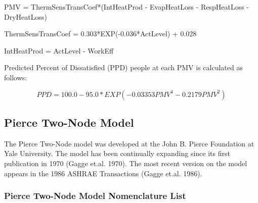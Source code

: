 PMV = ThermSensTransCoef*(IntHeatProd - EvapHeatLoss - RespHeatLoss - DryHeatLoss)

ThermSensTransCoef = 0.303*EXP(-0.036*ActLevel) + 0.028

IntHeatProd = ActLevel - WorkEff

Predicted Percent of Dissatisfied (PPD) people at each PMV is calculated as follows:

\begin{equation}
PPD = 100.0 - 95.0*EXP(-0.03353{PMV^{4}} - 0.2179{PMV^{2}})
\end{equation}

\subsection{Pierce Two-Node Model}\label{pierce-two-node-model}

The Pierce Two-Node model was developed at the John B. Pierce Foundation at Yale University. The model has been continually expanding since its first publication in 1970 (Gagge et.al. 1970). The most recent version on the model appears in the 1986 ASHRAE Transactions (Gagge et.al. 1986).

\subsubsection{Pierce Two-Node Model Nomenclature List}\label{pierce-two-node-model-nomenclature-list}

